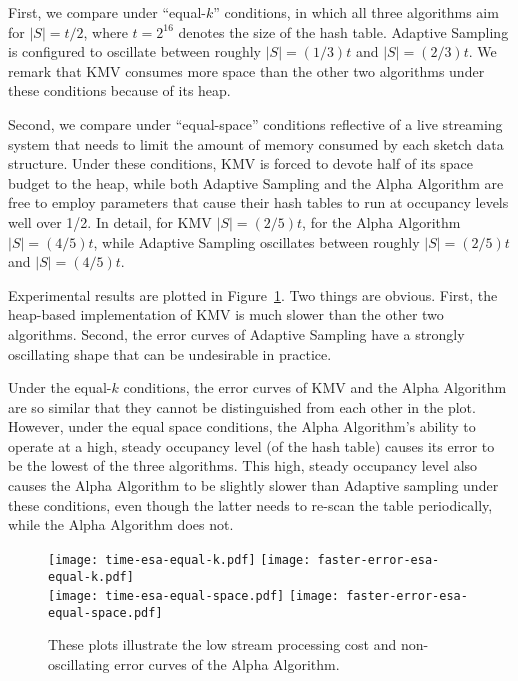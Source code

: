 \documentclass{article}
\begin{document}
First, we compare under ``equal-$k$'' conditions, in which all three
algorithms aim for $|S| = t/2$, where $t=2^{16}$ denotes the size of
the hash table. Adaptive Sampling is configured to oscillate between
roughly $|S| = (1/3)t$ and $|S| = (2/3)t$.  We remark that KMV
consumes more space than the other two algorithms under these
conditions because of its heap.

Second, we compare under ``equal-space'' conditions reflective of a
live streaming system that needs to limit the amount of memory
consumed by each sketch data structure. Under these conditions, KMV is
forced to devote half of its space budget to the heap, while both
Adaptive Sampling and the Alpha Algorithm are free to employ
parameters that cause their hash tables to run at occupancy levels
well over 1/2.  In detail, for KMV $|S|=(2/5)t$, for the Alpha
Algorithm $|S|=(4/5)t$, while Adaptive Sampling oscillates between
roughly $|S| = (2/5)t$ and $|S| = (4/5)t$.

Experimental results are plotted in Figure~\ref{fig:base-algo-tradeoffs}. Two things
are obvious. First, the heap-based implementation of KMV
is much slower than the other two algorithms. Second, the error curves
of Adaptive Sampling have a strongly oscillating shape that can be 
undesirable in practice.

Under the equal-$k$ conditions, the error curves of KMV and the Alpha
Algorithm are so similar that they cannot be distinguished from each
other in the plot. However, under the equal space conditions, the
Alpha Algorithm's ability to operate at a high, steady occupancy level (of
the hash table) causes its error to be the lowest of the three
algorithms. This high, steady occupancy level also causes the Alpha Algorithm
to be slightly slower than Adaptive sampling under these conditions,
even though the latter needs to re-scan the table periodically, 
while the Alpha Algorithm does not.

\begin{figure}
\begin{center}
\texttt{[image: time-esa-equal-k.pdf]}\quad
\texttt{[image: faster-error-esa-equal-k.pdf]} \\
\texttt{[image: time-esa-equal-space.pdf]}\quad
\texttt{[image: faster-error-esa-equal-space.pdf]} \\
\end{center}
\caption{These plots illustrate the low stream processing cost and non-oscillating
error curves of the Alpha Algorithm.}
\label{fig:base-algo-tradeoffs}
\end{figure}
\end{document}
